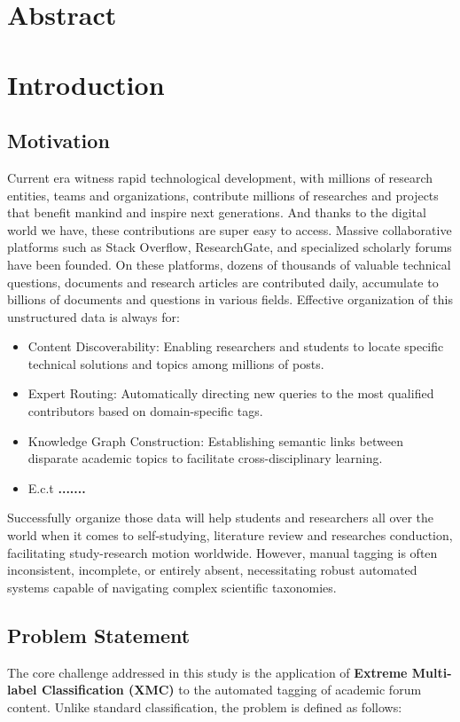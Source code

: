 \documentclass[a4paper]{report}
\begin{document}
\section*{Abstract}
\newpage
\section{Introduction}
\subsection{Motivation}
Current era witness rapid technological development, with millions of research entities, teams and organizations, contribute millions of researches and projects that benefit mankind and inspire next generations. And thanks to the digital world we have, these contributions are super easy to access. Massive collaborative platforms such as Stack Overflow, ResearchGate, and specialized scholarly forums have been founded. On these platforms, dozens of thousands of valuable technical questions, documents and research articles are contributed daily, accumulate to billions of documents and questions in various fields. Effective organization of this unstructured data is always for:
\begin{itemize}
    \item {Content Discoverability:} Enabling researchers and students to locate specific technical solutions and topics among millions of posts.
    \item {Expert Routing:} Automatically directing new queries to the most qualified contributors based on domain-specific tags.
    \item {Knowledge Graph Construction:} Establishing semantic links between disparate academic topics to facilitate cross-disciplinary learning.
    \item E.c.t \textbf{.......}
\end{itemize}
Successfully organize those data will help students and researchers all over the world when it comes to self-studying, literature review and researches conduction, facilitating study-research motion worldwide. However, manual tagging is often inconsistent, incomplete, or entirely absent, necessitating robust automated systems capable of navigating complex scientific taxonomies.

\subsection{Problem Statement}
The core challenge addressed in this study is the application of \textbf{Extreme Multi-label Classification (XMC)} to the automated tagging of academic forum content. Unlike standard classification, the problem is defined as follows:
\end{document}

